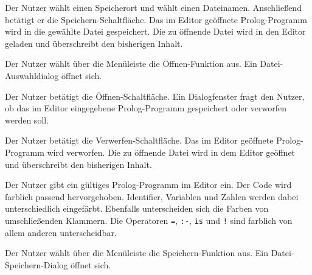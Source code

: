 \documentclass[parskip=full,11pt,twoside]{scrartcl}
\begin{document}
{Der Nutzer wählt einen Speicherort und wählt einen Dateinamen. Anschließend betätigt er die Speichern-Schaltfläche.}
{Das im Editor geöffnete Prolog-Programm wird in die gewählte Datei gespeichert. Die zu öffnende Datei wird in den Editor geladen und überschreibt den bisherigen Inhalt.}



{Der Nutzer wählt über die Menüleiste die Öffnen-Funktion aus.}
{Ein Datei-Auswahldialog öffnet sich.}

{Der Nutzer betätigt die Öffnen-Schaltfläche.}
{Ein Dialogfenster fragt den Nutzer, ob das im Editor eingegebene Prolog-Programm gespeichert oder verworfen werden soll.}

{Der Nutzer betätigt die Verwerfen-Schaltfläche.}
{Das im Editor geöffnete Prolog-Programm wird verworfen. Die zu öffnende Datei wird in dem Editor geöffnet und überschreibt den bisherigen Inhalt.}



{Der Nutzer gibt ein gültiges Prolog-Programm im Editor ein.}
{Der Code wird farblich passend hervorgehoben. Identifier, Variablen und Zahlen werden dabei unterschiedlich eingefärbt. Ebenfalls unterscheiden sich die Farben von umschließenden Klammern. Die Operatoren \texttt{=}, \texttt{:-}, \texttt{is} und \texttt{!} sind farblich von allem anderen unterscheidbar.}



{Der Nutzer wählt über die Menüleiste die Speichern-Funktion aus.}
{Ein Datei-Speichern-Dialog öffnet sich.}
\end{document}
